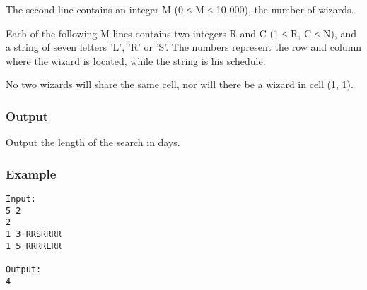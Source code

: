    The second line contains an integer M (0 ≤ M ≤ 10 000), the number of wizards.  

   Each of the following M lines contains two integers R and C (1 ≤ R, C ≤ N), and a string of seven letters 'L', 'R' or 'S'. The numbers represent the row and column where the wizard is located, while the string is his schedule.  

   No two wizards will share the same cell, nor will there be a wizard in cell (1, 1).  

\subsubsection{   Output  }

   Output the length of the search in days.  

\subsubsection{   Example  }
\begin{verbatim}
Input:
5 2
2
1 3 RRSRRRR
1 5 RRRRLRR

Output:
4
\end{verbatim}